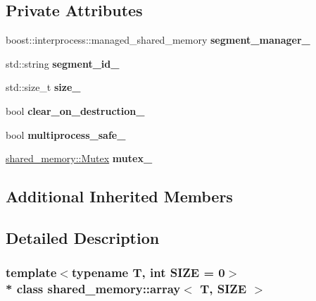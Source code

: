 \subsection*{Private Attributes}
\begin{DoxyCompactItemize}
\item 
boost\+::interprocess\+::managed\+\_\+shared\+\_\+memory {\bfseries segment\+\_\+manager\+\_\+}\hypertarget{classshared__memory_1_1array_a43c56477481ae684932b6a03b64d7b67}{}\label{classshared__memory_1_1array_a43c56477481ae684932b6a03b64d7b67}

\item 
std\+::string {\bfseries segment\+\_\+id\+\_\+}\hypertarget{classshared__memory_1_1array_a25a07e97c454f8fb122eb092ab29812c}{}\label{classshared__memory_1_1array_a25a07e97c454f8fb122eb092ab29812c}

\item 
std\+::size\+\_\+t {\bfseries size\+\_\+}\hypertarget{classshared__memory_1_1array_a1b47b48a2779e766a80403f47404876a}{}\label{classshared__memory_1_1array_a1b47b48a2779e766a80403f47404876a}

\item 
bool {\bfseries clear\+\_\+on\+\_\+destruction\+\_\+}\hypertarget{classshared__memory_1_1array_afb6fcb395ac52cb9eaaef2882b623d23}{}\label{classshared__memory_1_1array_afb6fcb395ac52cb9eaaef2882b623d23}

\item 
bool {\bfseries multiprocess\+\_\+safe\+\_\+}\hypertarget{classshared__memory_1_1array_a7051346ccb28372b2ea5587714113079}{}\label{classshared__memory_1_1array_a7051346ccb28372b2ea5587714113079}

\item 
\hyperlink{classshared__memory_1_1Mutex}{shared\+\_\+memory\+::\+Mutex} {\bfseries mutex\+\_\+}\hypertarget{classshared__memory_1_1array_afaf6604cf5e2c380f86679e1515e6674}{}\label{classshared__memory_1_1array_afaf6604cf5e2c380f86679e1515e6674}

\end{DoxyCompactItemize}
\subsection*{Additional Inherited Members}


\subsection{Detailed Description}
\subsubsection*{template$<$typename T, int S\+I\+ZE = 0$>$\\*
class shared\+\_\+memory\+::array$<$ T, S\+I\+Z\+E $>$}

